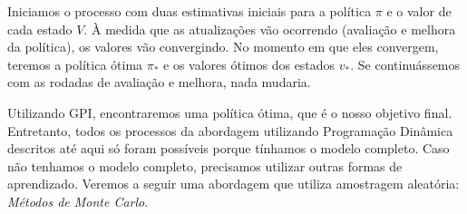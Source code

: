 \documentclass{article}
\begin{document}
        Iniciamos o processo com duas estimativas iniciais para a política $\pi$ e o valor de cada estado $V$. À medida que as atualizações vão ocorrendo (avaliação e melhora da política), os valores vão convergindo. No momento em que eles convergem, teremos a política ótima $\pi_*$ e os valores ótimos dos estados $v_*$. Se continuássemos com as rodadas de avaliação e melhora, nada mudaria.
        
        Utilizando GPI, encontraremos uma política ótima, que é o nosso objetivo final. Entretanto, todos os processos da abordagem utilizando Programação Dinâmica descritos até aqui só foram possíveis porque tínhamos o modelo completo. Caso não tenhamos o modelo completo, precisamos utilizar outras formas de aprendizado. Veremos a seguir uma abordagem que utiliza amostragem aleatória: \emph{Métodos de Monte Carlo}.
        
\end{document}
